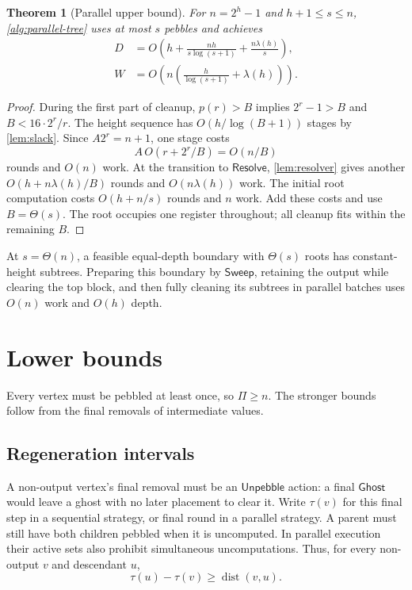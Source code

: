 \documentclass[11pt]{article}
\newtheorem{theorem}{Theorem}[section]
\theoremstyle{definition}
\theoremstyle{remark}
\newcommand{\Unp}{\mathsf{Unpebble}}
\newcommand{\Ghost}{\mathsf{Ghost}}
\newcommand{\Sweep}{\mathsf{Sweep}}
\newcommand{\Resolve}{\mathsf{Resolve}}
\begin{document}
\begin{theorem}[Parallel upper bound]
\label{thm:parallel-upper}
For $n=2^h-1$ and $h+1\le s\le n$, \cref{alg:parallel-tree} uses at most $s$ pebbles and achieves
\begin{align}
D&=O\!\left(h+\frac{nh}{s\log(s+1)}+\frac{n\lambda(h)}s\right), \label{eq:depth-upper}\\
W&=O\!\left(n\left(\frac h{\log(s+1)}+\lambda(h)\right)\right). \label{eq:depth-schedule-work}
\end{align}
\end{theorem}
\begin{proof}
During the first part of cleanup, $p(r)>B$ implies $2^r-1>B$ and $B<16\cdot2^r/r$. The height sequence has $O(h/\log(B+1))$ stages by \cref{lem:slack}. Since $A2^r=n+1$, one stage costs
\[
A\,O(r+2^r/B)=O(n/B)
\]
rounds and $O(n)$ work. At the transition to $\Resolve$, \cref{lem:resolver} gives another $O(h+n\lambda(h)/B)$ rounds and $O(n\lambda(h))$ work. The initial root computation costs $O(h+n/s)$ rounds and $n$ work. Add these costs and use $B=\Theta(s)$. The root occupies one register throughout; all cleanup fits within the remaining $B$.
\end{proof}

At $s=\Theta(n)$, a feasible equal-depth boundary with $\Theta(s)$ roots has constant-height subtrees. Preparing this boundary by $\Sweep$, retaining the output while clearing the top block, and then fully cleaning its subtrees in parallel batches uses $O(n)$ work and $O(h)$ depth.

\section{Lower bounds}
\label{sec:lower-bounds}

Every vertex must be pebbled at least once, so $\Pi\ge n$. The stronger bounds follow from the final removals of intermediate values.

\subsection{Regeneration intervals}

A non-output vertex's final removal must be an $\Unp$ action: a final $\Ghost$ would leave a ghost with no later placement to clear it. Write $\tau(v)$ for this final step in a sequential strategy, or final round in a parallel strategy. A parent must still have both children pebbled when it is uncomputed. In parallel execution their active sets also prohibit simultaneous uncomputations. Thus, for every non-output $v$ and descendant $u$,
\begin{equation}
 \tau(u)-\tau(v)\ge\operatorname{dist}(v,u).
 \label{eq:final-removal}
\end{equation}
\end{document}
